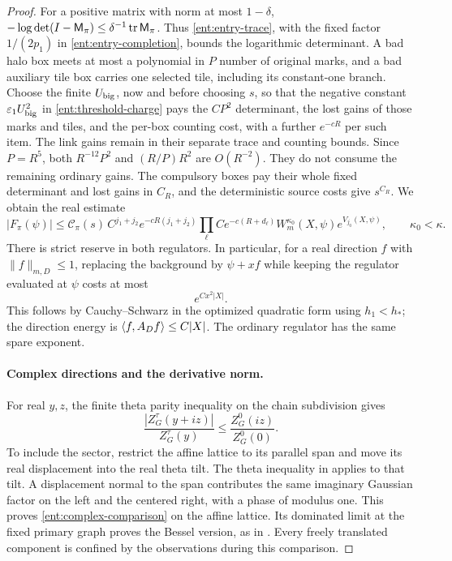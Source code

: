 \begin{proof}
For a positive matrix with norm at most \(1-\delta\),
\(-\log\det(I-\mathsf M_\pi)\le\delta^{-1}\operatorname{tr} \mathsf M_\pi\).  Thus
\eqref{ent:entry-trace}, with the fixed factor \(1/(2p_1)\) in
\eqref{ent:entry-completion}, bounds the logarithmic determinant.
A bad halo box meets at most a polynomial in \(P\) number of original
marks, and a bad auxiliary tile box carries one selected tile, including
its constant-one branch.  Choose the finite \(U_{\rm big}\), now and before
choosing \(s\), so that the negative constant
\(\varepsilon_1U_{\rm big}^2\) in
\eqref{ent:threshold-charge} pays the \(CP^2\)
determinant, the lost gains of those marks and tiles, and the per-box
counting cost, with a further \(e^{-cR}\) per such item.
The link gains remain in their separate trace and counting bounds.
Since \(P=R^5\),
both \(R^{-12}P^2\) and \((R/P)R^2\) are \(O(R^{-2})\).
They do not consume the remaining ordinary gains.  The
compulsory boxes pay their whole fixed determinant and
lost gains in \(C_R\), and the deterministic source costs
give \(s^{C_R}\).  We obtain the real estimate
\begin{equation}\label{ent:real-pattern}
 |F_\pi(\psi)|
 \le \mathcal C_\pi(s)\,
 C^{j_1+j_2}e^{-cR(j_1+j_2)}
 \prod_\ell Ce^{-c(R+d_\ell)}
 W_m^{\kappa_0}(X,\psi)e^{V_{j_0}(X,\psi)},
 \qquad \kappa_0<\kappa .
\end{equation}
There is strict reserve in both regulators.  In particular,
for a real direction \(f\) with \(\|f\|_{m,D}\le1\),
replacing the background by \(\psi+xf\) while keeping the
regulator evaluated at \(\psi\) costs at most
\begin{equation}\label{ent:real-translation}
                              e^{Cx^2|X|}.
\end{equation}
This follows by Cauchy--Schwarz in the optimized quadratic
form using \(h_1<h_*\); the direction energy is
\(\langle f,A_Df\rangle\le C|X|\).  The ordinary regulator has
the same spare exponent.

\paragraph{Complex directions and the derivative norm.}
For real \(y,z\), the finite theta parity inequality on
the chain subdivision gives
\begin{equation}\label{ent:complex-comparison}
 \frac{|Z_G^\tau(y+iz)|}{Z_G^\tau(y)}
                 \le\frac{Z_G^0(iz)}{Z_G^0(0)}.
\end{equation}
To include the sector, restrict the affine lattice to its
parallel span and move its real displacement into the
real theta tilt.  The theta inequality in
\cite[Equation~(9.29)]{B} applies to that tilt.  A
displacement normal to the span contributes the same
imaginary Gaussian factor on the left and the centered
right, with a phase of modulus one.  This proves
\eqref{ent:complex-comparison} on the affine lattice.
Its dominated limit at the fixed primary graph proves
the Bessel version, as in
\cite[Equation~(5.26)]{C}.  Every freely translated
component is confined by the observations during this
comparison.


\end{proof}
